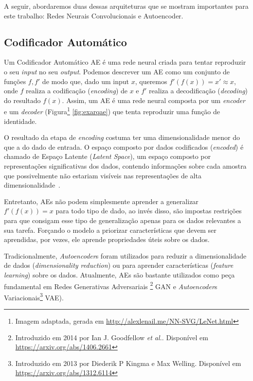 A seguir, abordaremos duas dessas arquiteturas que se mostram importantes para este trabalho: Redes Neurais Convolucionais e Autoencoder.

\subsection{Codificador Automático}

Um Codificador Automático \acrlong{AE} é uma rede neural criada para tentar reproduzir o seu \textit{input} no seu \textit{output}. Podemos descrever um \acrshort{AE} como um conjunto de funções $f, f'$ de modo que, dado um input $x$, queremos $f'(f(x)) = x' \approx x$, onde $f$ realiza a codificação (\textit{encoding}) de $x$ e $f'$ realiza a decodificação (\textit{decoding}) do resultado $f(x)$. Assim, um \acrshort{AE} é uma rede neural composta por um \textit{encoder} e um \textit{decoder} (Figura\footnote{Imagem adaptada, gerada em \url{http://alexlenail.me/NN-SVG/LeNet.html}} \ref{fig:exarqae}) que tenta reproduzir uma função de identidade.

O resultado da etapa de \textit{encoding} costuma ter uma dimensionalidade menor do que a do dado de entrada. O espaço composto por dados codificados (\textit{encoded}) é chamado de Espaço Latente (\textit{Latent Space}), um espaço composto por representações significativas dos dados, contendo informações sobre cada amostra que possivelmente não estariam visíveis nas representações de alta dimensionalidade~\cite{60}.

Entretanto, \acrshort{AE}s não podem simplesmente aprender a generalizar $f'(f(x)) = x$ para todo tipo de dado, ao invés disso, são impostas restrições para que consigam esse tipo de generalização apenas para os dados relevantes a sua tarefa. Forçando o modelo a priorizar características que devem ser aprendidas, por vezes, ele aprende propriedades úteis sobre os dados.

Tradicionalmente, \textit{Autoencoder}s foram utilizados para reduzir a dimensionalidade de dados (\textit{dimensionality reduction}) ou para aprender características (\textit{feature learning}) sobre os dados. Atualmente, \acrshort{AE}s são bastante utilizados como peça fundamental em Redes Generativas Adversariais \footnote{Introduzido em 2014 por Ian J. Goodfellow \textit{et al.}. Disponível em \url{https://arxiv.org/abs/1406.2661}} \acrlong{GAN} e \textit{Autoencoder}s Variacionais\footnote{Introduzido em 2013 por Diederik P Kingma e Max Welling. Disponível em \url{https://arxiv.org/abs/1312.6114}} \acrlong{VAE}).

